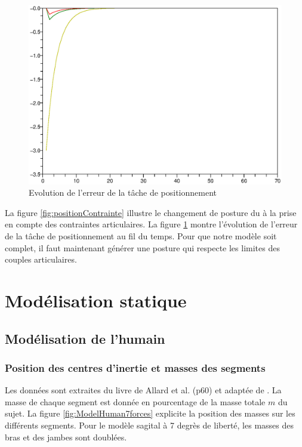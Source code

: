 \documentclass[a4paper, 10pt ]{article}
\begin{document}
\begin{figure}[h]
\centering
\includegraphics[width=0.8\columnwidth]{images/simu/erreurq1.eps}
\caption{Evolution de l'erreur de la tâche de positionnement}
\label{fig:erreur}
\end{figure}

La figure \ref{fig:positionContrainte} illustre le changement de posture du à la prise en compte des contraintes articulaires. La figure \ref{fig:erreur} montre l'évolution de l'erreur de la tâche de positionnement au fil du temps.
Pour que notre modèle soit complet, il faut maintenant générer une posture qui respecte les limites des couples articulaires.


\newpage
\section{Modélisation statique}

\subsection{Modélisation de l'humain}

\subsubsection{Position des centres d'inertie et masses des segments}

Les données sont extraites du livre de Allard et al. \cite{Allard11} (p60) et adaptée de \cite{Winter90}. La masse de chaque segment est donnée en pourcentage de la masse totale $m$ du sujet.
La figure \ref{fig:ModelHuman7forces} explicite la position des masses sur les différents segments. Pour le modèle sagital à 7 degrès de liberté, les masses des bras et des jambes sont doublées.
\end{document}
